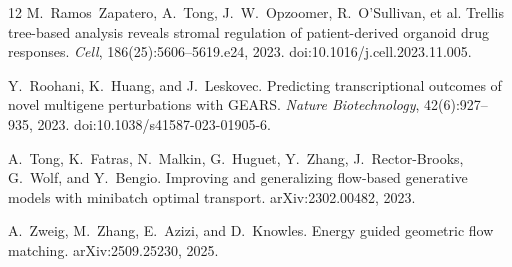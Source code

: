 \documentclass{article}
\begin{document}
\begin{thebibliography}{12}
M.~Ramos~Zapatero, A.~Tong, J.~W.~Opzoomer, R.~O'Sullivan, et al.
\newblock Trellis tree-based analysis reveals stromal regulation of patient-derived organoid
drug responses.
\newblock \emph{Cell}, 186(25):5606--5619.e24, 2023. doi:10.1016/j.cell.2023.11.005.

Y.~Roohani, K.~Huang, and J.~Leskovec.
\newblock Predicting transcriptional outcomes of novel multigene perturbations with GEARS.
\newblock \emph{Nature Biotechnology}, 42(6):927--935, 2023. doi:10.1038/s41587-023-01905-6.

A.~Tong, K.~Fatras, N.~Malkin, G.~Huguet, Y.~Zhang, J.~Rector-Brooks, G.~Wolf, and
Y.~Bengio.
\newblock Improving and generalizing flow-based generative models with minibatch optimal
transport.
\newblock arXiv:2302.00482, 2023.

A.~Zweig, M.~Zhang, E.~Azizi, and D.~Knowles.
\newblock Energy guided geometric flow matching.
\newblock arXiv:2509.25230, 2025.

\end{thebibliography}
\end{document}
